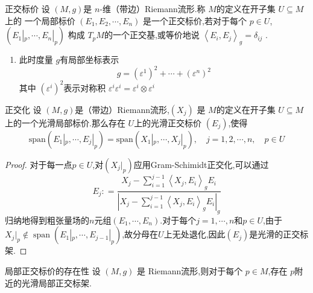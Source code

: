 \documentclass[../../几何与拓扑.tex]{subfiles}
\begin{document}
\begin{definition}{正交标价}
    设 $ \left( M,g \right)  $是 $ n $-维（带边）Riemann流形.称 $ M $的定义在开子集 $ U\subseteq M $上的 一个局部标价 $ \left( E_1,E_2,\cdots,E_n \right)  $  是一个正交标价,若对于每个 $ p \in U $,$ \left( E_1|_{p},\cdots ,E_{n}|_{p} \right)  $  构成 $ T_{p}M $的一个正交基,或等价地说 $ \left<E_{i},E_{j} \right>_{g} = \delta_{ij} $  .
\end{definition}
\begin{remark}
    \begin{enumerate}
        \item 此时度量 \(  g  \)有局部坐标表示 \[
        g =  \left(  \varepsilon ^{1} \right)^{2}+ \cdots + \left(  \varepsilon ^{n} \right)^{2}  
        \] 其中 \(  \left(  \varepsilon ^{i} \right)^{2}   \)表示对称积 \(   \varepsilon ^{i} \varepsilon ^{i} =   \varepsilon ^{i}\otimes  \varepsilon ^{i}  \)  
    \end{enumerate}
    
\end{remark}
\begin{proposition}{正交化}
    设 $ \left( M,g \right)  $是（带边）Riemann流形,$ \left( X_{j} \right)  $  是 $ M $的定义在开子集 $ U\subseteq M $上的一个光滑局部标价.那么存在 $ U $上的光滑正交标价 $ \left( E_{j} \right)  $,使得 $$
    \mathrm{span}\left( E_1|_{p},\cdots ,E_{j}|_{p} \right) = \mathrm{span}\left( X_{1}|_{p},\cdots ,X_{j}|_{p} \right)  ,\quad j= 1,2,\cdots,n,\quad p \in U
    $$    
\end{proposition}
\begin{proof}
    对于每一点$p \in U$,对$\left( X_{j}|_{p} \right)$应用Gram-Schimidt正交化,可以通过 $$ E_{j}: = \frac{{X_{j}-\sum _{i=1}^{j-1}\left< X_{j}, E_{i} \right>_{g}E_{i}}}{\left| X_{j}-\sum _{i=1}^{j-1}\left< X_{j},E_{i} \right>_{g} E_{i} \right| _{g}} $$归纳地得到粗张量场的$n$元组$\left( E_{1},{\cdots},E_{n} \right)$.对于每个$j=1,{\cdots},n$和$p \in U$,由于$X_{j}|_{p}\not\in \operatorname{span}\left( E_{1}|_{p},{\cdots},E_{j-1}|_{p} \right)$,故分母在$U$上无处退化,因此$\left( E_{j} \right)$是光滑的正交标架.

\end{proof}

\begin{corollary}{局部正交标价的存在性}
    设 $ \left( M,g \right)  $ 是 Riemann流形,则对于每个 $ p \in M $,存在 $ p $附近的光滑局部正交标架. 
\end{corollary}
\end{document}
